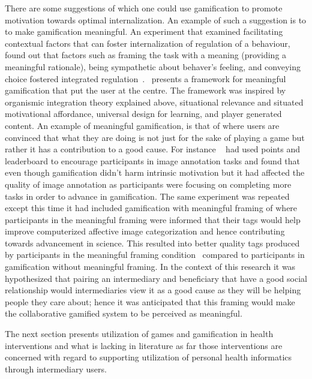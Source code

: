 There are some suggestions of which one could use gamification to promote motivation towards optimal internalization. An example of such a suggestion is to to make gamification meaningful. An experiment that examined facilitating contextual factors that can foster internalization of regulation of a behaviour, found out that factors such as framing the task with a meaning (providing a meaningful rationale), being sympathetic about behaver's  feeling, and conveying choice fostered integrated regulation~\citep{deci1994facilitating}.~\cite{nicholson2012user} presents a framework for meaningful gamification that put the user at the centre. The framework was inspired by organismic integration theory explained above, situational relevance and situated motivational affordance, universal design for learning, and player generated content. An example of meaningful gamification, is that of where users are convinced that what they are doing is not just for the sake of playing a game but rather it has a contribution to a good cause. For instance ~\cite{mekler2013points} had used points and leaderboard to encourage participants in image annotation tasks and found that even though gamification didn't harm intrinsic motivation but it had affected the quality of image annotation as participants were focusing on completing more tasks in order to advance in gamification. The same experiment was repeated except this time it had included gamification with meaningful framing of where participants in the meaningful framing were informed that their tags would help improve computerized affective image categorization and hence contributing towards advancement in science. This resulted into better quality tags produced by participants in the meaningful framing condition~\citep{mekler2013disassembling} compared to participants in gamification without meaningful framing. In the context of this research it was hypothesized that pairing an intermediary and beneficiary that have a good social relationship would intermediaries view it as a good cause as they will be helping people they care about; hence it was anticipated that this framing would make the collaborative gamified system to be perceived as meaningful.

The next section presents utilization of games and gamification in health interventions and what is lacking in literature as far those interventions are concerned with regard to supporting utilization of personal health informatics through intermediary users.

